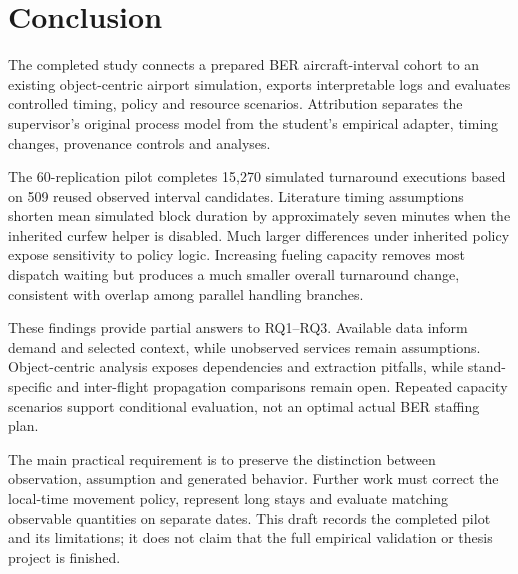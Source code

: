 \chapter{Conclusion}
\label{ch:conclusion}
The completed study connects a prepared BER aircraft-interval cohort to an existing object-centric airport simulation, exports interpretable logs and evaluates controlled timing, policy and resource scenarios. Attribution separates the supervisor's original process model from the student's empirical adapter, timing changes, provenance controls and analyses.

The 60-replication pilot completes 15,270 simulated turnaround executions based on 509 reused observed interval candidates. Literature timing assumptions shorten mean simulated block duration by approximately seven minutes when the inherited curfew helper is disabled. Much larger differences under inherited policy expose sensitivity to policy logic. Increasing fueling capacity removes most dispatch waiting but produces a much smaller overall turnaround change, consistent with overlap among parallel handling branches.

These findings provide partial answers to RQ1--RQ3. Available data inform demand and selected context, while unobserved services remain assumptions. Object-centric analysis exposes dependencies and extraction pitfalls, while stand-specific and inter-flight propagation comparisons remain open. Repeated capacity scenarios support conditional evaluation, not an optimal actual BER staffing plan.

The main practical requirement is to preserve the distinction between observation, assumption and generated behavior. Further work must correct the local-time movement policy, represent long stays and evaluate matching observable quantities on separate dates. This draft records the completed pilot and its limitations; it does not claim that the full empirical validation or thesis project is finished.
